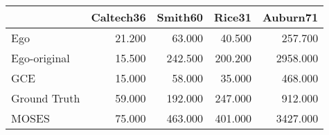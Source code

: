 \begin{tabular}{lrrrr}
\toprule
{} & Caltech36 & Smith60 &  Rice31 & Auburn71 \\
\midrule
Ego          &    21.200 &  63.000 &  40.500 &  257.700 \\
Ego-original &    15.500 & 242.500 & 200.200 & 2958.000 \\
GCE          &    15.000 &  58.000 &  35.000 &  468.000 \\
Ground Truth &    59.000 & 192.000 & 247.000 &  912.000 \\
MOSES        &    75.000 & 463.000 & 401.000 & 3427.000 \\
\bottomrule
\end{tabular}
